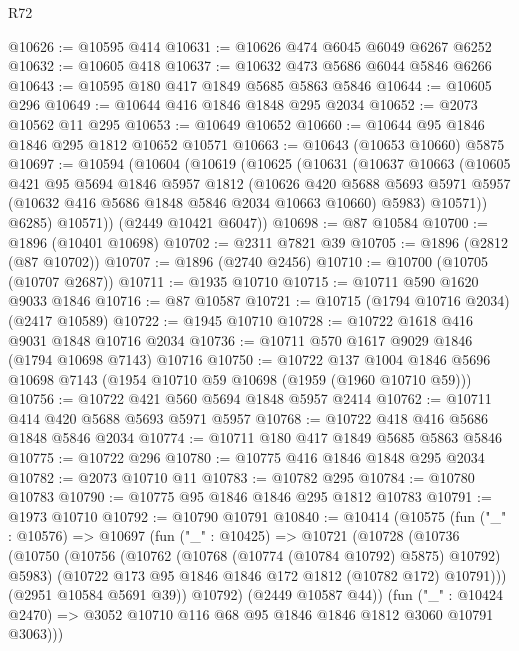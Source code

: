\begin{lexlean}{R72}
\begin{coremodule}
@10626 := @10595 @414
@10631 := @10626 @474 @6045 @6049 @6267 @6252
@10632 := @10605 @418
@10637 := @10632 @473 @5686 @6044 @5846 @6266
@10643 := @10595 @180 @417 @1849 @5685 @5863 @5846
@10644 := @10605 @296
@10649 := @10644 @416 @1846 @1848 @295 @2034
@10652 := @2073 @10562 @11 @295
@10653 := @10649 @10652
@10660 := @10644 @95 @1846 @1846 @295 @1812 @10652 @10571
@10663 := @10643 (@10653 @10660) @5875
@10697 := @10594
    (@10604
      (@10619
        (@10625
          (@10631
            (@10637
              @10663
              (@10605
                @421
                @95
                @5694
                @1846
                @5957
                @1812
                (@10626
                  @420
                  @5688
                  @5693
                  @5971
                  @5957
                  (@10632 @416 @5686 @1848 @5846 @2034 @10663 @10660)
                  @5983)
                @10571))
            @6285)
          @10571))
      (@2449 @10421 @6047))
@10698 := @87 @10584
@10700 := @1896 (@10401 @10698)
@10702 := @2311 @7821 @39
@10705 := @1896 (@2812 (@87 @10702))
@10707 := @1896 (@2740 @2456)
@10710 := @10700 (@10705 (@10707 @2687))
@10711 := @1935 @10710
@10715 := @10711 @590 @1620 @9033 @1846
@10716 := @87 @10587
@10721 := @10715 (@1794 @10716 @2034) (@2417 @10589)
@10722 := @1945 @10710
@10728 := @10722 @1618 @416 @9031 @1848 @10716 @2034
@10736 := @10711 @570 @1617 @9029 @1846 (@1794 @10698 @7143) @10716
@10750 := @10722
    @137
    @1004
    @1846
    @5696
    @10698
    @7143
    (@1954 @10710 @59 @10698 (@1959 (@1960 @10710 @59)))
@10756 := @10722 @421 @560 @5694 @1848 @5957 @2414
@10762 := @10711 @414 @420 @5688 @5693 @5971 @5957
@10768 := @10722 @418 @416 @5686 @1848 @5846 @2034
@10774 := @10711 @180 @417 @1849 @5685 @5863 @5846
@10775 := @10722 @296
@10780 := @10775 @416 @1846 @1848 @295 @2034
@10782 := @2073 @10710 @11
@10783 := @10782 @295
@10784 := @10780 @10783
@10790 := @10775 @95 @1846 @1846 @295 @1812 @10783
@10791 := @1973 @10710
@10792 := @10790 @10791
@10840 := @10414
    (@10575
      (fun ("_" : @10576) =>
      @10697
        (fun ("_" : @10425) =>
        @10721
          (@10728
            (@10736
              (@10750
                (@10756
                  (@10762 (@10768 (@10774 (@10784 @10792) @5875) @10792) @5983)
                  (@10722 @173 @95 @1846 @1846 @172 @1812 (@10782 @172) @10791)))
              (@2951 @10584 @5691 @39))
            @10792)
          (@2449 @10587 @44))
        (fun ("_" : @10424 @2470) =>
        @3052 @10710 @116 @68 @95 @1846 @1846 @1812 @3060 @10791 @3063)))

\end{coremodule}
\end{lexlean}
